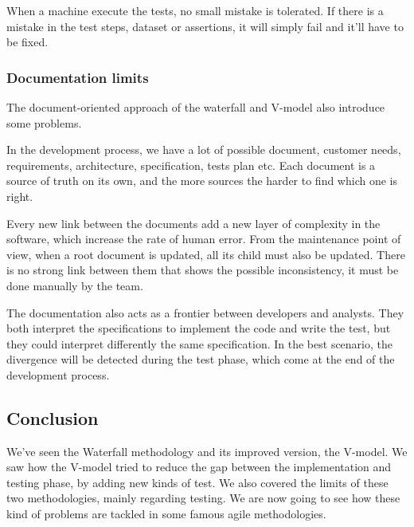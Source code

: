 When a machine execute the tests, no small mistake is tolerated.
If there is a mistake in the test steps, dataset or assertions, it will
simply fail and it'll have to be fixed.

\subsubsection{Documentation limits}
The document-oriented approach of the waterfall and V-model also introduce
some problems.

In the development process, we have a lot of possible document, customer
needs, requirements, architecture, specification, tests plan etc.
Each document is a source of truth on its own, and the more sources the
harder to find which one is right.

Every new link between the documents add a new layer of complexity in the
software, which increase the rate of human error.
From the maintenance point of view, when a root document is updated, all its
child must also be updated.
There is no strong link between them that shows the possible inconsistency,
it must be done manually by the team.

The documentation also acts as a frontier between developers and analysts.
They both interpret the specifications to implement the code and write the
test, but they could interpret differently the same specification.
In the best scenario, the divergence will be detected during the test phase,
which come at the end of the development process.

\subsection{Conclusion}\label{subsec:conclusion}
We've seen the Waterfall methodology and its improved version, the V-model.
We saw how the V-model tried to reduce the gap between the implementation and
testing phase, by adding new kinds of test.
We also covered the limits of these two methodologies, mainly regarding testing.
We are now going to see how these kind of problems are tackled in some famous
agile methodologies.
